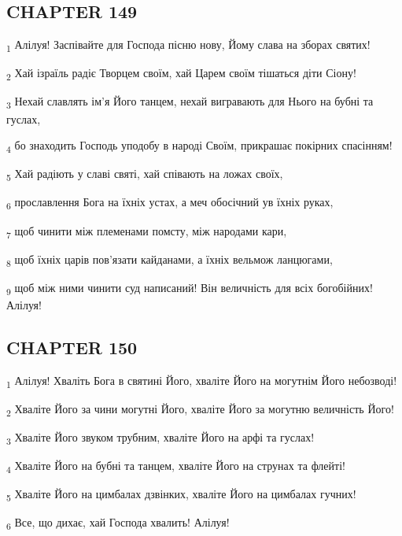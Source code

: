 \subsection{CHAPTER 149}
\begin{tcolorbox}
\textsubscript{1} Алілуя! Заспівайте для Господа пісню нову, Йому слава на зборах святих!
\end{tcolorbox}
\begin{tcolorbox}
\textsubscript{2} Хай ізраїль радіє Творцем своїм, хай Царем своїм тішаться діти Сіону!
\end{tcolorbox}
\begin{tcolorbox}
\textsubscript{3} Нехай славлять ім'я Його танцем, нехай вигравають для Нього на бубні та гуслах,
\end{tcolorbox}
\begin{tcolorbox}
\textsubscript{4} бо знаходить Господь уподобу в народі Своїм, прикрашає покірних спасінням!
\end{tcolorbox}
\begin{tcolorbox}
\textsubscript{5} Хай радіють у славі святі, хай співають на ложах своїх,
\end{tcolorbox}
\begin{tcolorbox}
\textsubscript{6} прославлення Бога на їхніх устах, а меч обосічний ув їхніх руках,
\end{tcolorbox}
\begin{tcolorbox}
\textsubscript{7} щоб чинити між племенами помсту, між народами кари,
\end{tcolorbox}
\begin{tcolorbox}
\textsubscript{8} щоб їхніх царів пов'язати кайданами, а їхніх вельмож ланцюгами,
\end{tcolorbox}
\begin{tcolorbox}
\textsubscript{9} щоб між ними чинити суд написаний! Він величність для всіх богобійних! Алілуя!
\end{tcolorbox}
\subsection{CHAPTER 150}
\begin{tcolorbox}
\textsubscript{1} Алілуя! Хваліть Бога в святині Його, хваліте Його на могутнім Його небозводі!
\end{tcolorbox}
\begin{tcolorbox}
\textsubscript{2} Хваліте Його за чини могутні Його, хваліте Його за могутню величність Його!
\end{tcolorbox}
\begin{tcolorbox}
\textsubscript{3} Хваліте Його звуком трубним, хваліте Його на арфі та гуслах!
\end{tcolorbox}
\begin{tcolorbox}
\textsubscript{4} Хваліте Його на бубні та танцем, хваліте Його на струнах та флейті!
\end{tcolorbox}
\begin{tcolorbox}
\textsubscript{5} Хваліте Його на цимбалах дзвінких, хваліте Його на цимбалах гучних!
\end{tcolorbox}
\begin{tcolorbox}
\textsubscript{6} Все, що дихає, хай Господа хвалить! Алілуя!
\end{tcolorbox}
